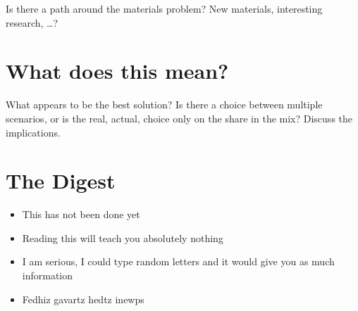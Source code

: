 \begin{kaobox}[frametitle=TO-DO]
Is there a path around the materials problem? New materials, interesting research, \ldots ?
\end{kaobox}

\section{What does this mean?}

What appears to be the best solution? Is there a choice between multiple scenarios, or is the real, actual, choice only on the share in the mix? Discuss the implications.


\section{The Digest}


\begin{kaoboxgreen}[frametitle=Main Takeaways]

\begin{itemize}
\item This has not been done yet
\item Reading this will teach you absolutely nothing
\item I am serious, I could type random letters and it would give you as much information
\item Fedhiz gavartz hedtz inewps
\end{itemize}
  
\end{kaoboxgreen}